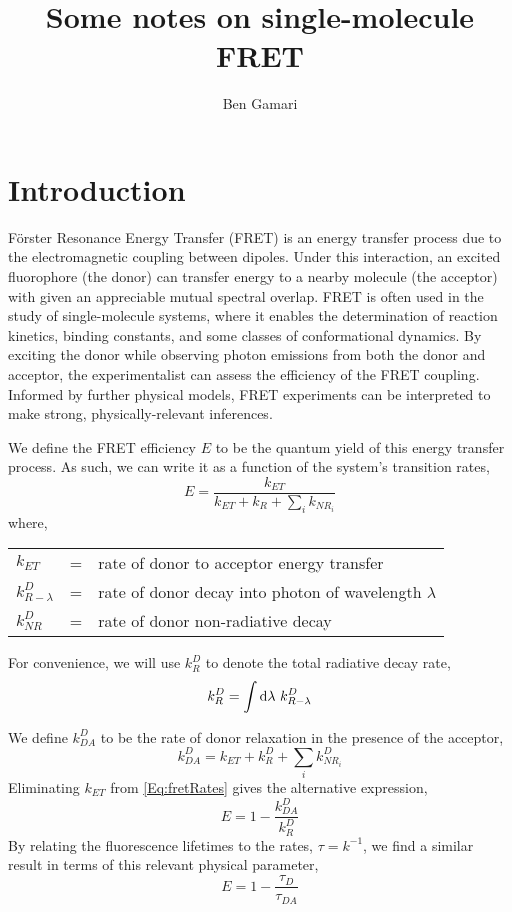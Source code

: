 \documentclass{article}
\title{Some notes on single-molecule FRET}
\author{Ben Gamari}
\newcommand{\NR}{\ensuremath{\mathit{NR}}}          %
\newcommand{\ET}{\ensuremath{\mathit{ET}}}          %
\begin{document}
\maketitle
\tableofcontents
\clearpage

\section{Introduction}
F\"orster Resonance Energy Transfer (FRET) is an energy transfer
process due to the electromagnetic coupling between dipoles. Under
this interaction, an excited fluorophore (the donor) can transfer energy
to a nearby molecule (the acceptor) with given an appreciable mutual
spectral overlap. FRET is often used in the study of single-molecule
systems, where it enables the determination of reaction kinetics,
binding constants, and some classes of conformational dynamics.
By exciting the donor while observing photon emissions from both the
donor and acceptor, the experimentalist can assess the efficiency of
the FRET coupling. Informed by further physical models, FRET
experiments can be interpreted to make strong, physically-relevant
inferences.

We define the FRET efficiency $E$ to be the quantum yield of this
energy transfer process. As such, we can write it as a function of the
system's transition rates,
\begin{equation}
  E = \frac{k_\ET}{k_\ET + k_R + \sum_i k_{\NR_i}}
  \label{Eq:fretRates}
\end{equation}
where,
\begin{tabular}{lcl}
  $k_\ET$          & = & rate of donor to acceptor energy transfer \\
  $k^D_{R-\lambda}$  & = & rate of donor decay into photon of wavelength $\lambda$ \\
  $k^D_\NR$        & = & rate of donor non-radiative decay \\
\end{tabular}
For convenience, we will use $k^D_R$ to denote the total radiative decay rate,
\[ k^D_R = \int \dif\lambda~ k^D_{R-\lambda} \]

We define $k^D_{DA}$ to be the rate of donor relaxation in the presence
of the acceptor,
\[ k^D_{DA} = k_\ET + k^D_R + \sum_i k^D_{\NR_i} \]
Eliminating $k_\ET$ from \eqref{Eq:fretRates} gives the alternative expression,
\begin{equation}
  E = 1 - \frac{k^D_{DA}}{k^D_R} \label{Eq:fretEffRates}
\end{equation}
By relating the fluorescence lifetimes to the rates, $\tau = k^{-1}$,
we find a similar result in terms of this relevant physical parameter,
\begin{equation}
  E = 1 - \frac{\tau_D}{\tau_{DA}} \label{Eq:fretEffTau}
\end{equation}
\end{document}
